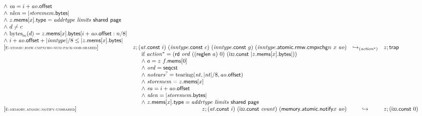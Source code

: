$$\begin{array}[t]{@{}lrcl@{}l@{}}
{\begin{array}[t]{@{}l@{}}
{\land}~ {\mathit{ea}} = i + {\mathit{ao}}{.}\mathsf{offset} \\
{\land}~ {\mathit{nlen}} = {|{\mathit{storemem}}{.}\mathsf{bytes}|} \\
{\land}~ z{.}\mathsf{mems}{}[x]{.}\mathsf{type} = {\mathit{addrtype}}~{\mathit{limits}}~\mathsf{shared}~\mathsf{page} \\
{\land}~ d \neq c \\
{\land}~ {{\mathrm{bytes}}}_{{\mathsf{i}}{n}}(d) = z{.}\mathsf{mems}{}[x]{.}\mathsf{bytes}{}[i + {\mathit{ao}}{.}\mathsf{offset} : n / 8] \\
{\land}~ i + {\mathit{ao}}{.}\mathsf{offset} + {|{\mathit{inntype}}|} / 8 \leq {|z{.}\mathsf{mems}{}[x]{.}\mathsf{bytes}|} \\
\end{array}
} \\
{[\textsc{\scriptsize E{-}atomic.rmw.cmpxchg{-}num{-}pack{-}oob{-}shared}]} \quad & z ; ({\mathit{at}}{.}\mathsf{const}~i)~({\mathit{inntype}}{.}\mathsf{const}~c)~({\mathit{inntype}}{.}\mathsf{const}~g)~({{\mathit{inntype}}{.}\mathsf{atomic}{.}\mathsf{rmw}{.}\mathsf{cmpxchg}}{n}~x~{\mathit{ao}}) & {\hookrightarrow}_{({{\mathit{action}}^\ast})} {} & z ; \mathsf{trap} &  \\
& \multicolumn{4}{@{}l@{}}{\quad
\quad
\begin{array}[t]{@{}l@{}}
\mbox{if}~ {{\mathit{action}}^\ast} = (\mathsf{rd}~{\mathit{ord}}~((\mathsf{reglen}~a)~0)~(\mathsf{i{\scriptstyle 32}}{.}\mathsf{const}~{|z{.}\mathsf{mems}{}[x]{.}\mathsf{bytes}|})) \\
{\land}~ a = z~f{.}\mathsf{mems}{}[0] \\
{\land}~ {\mathit{ord}} = \mathsf{seqcst} \\
{\land}~ {{\mathit{notears}}^?} = {\mathrm{tearing}}({\mathit{nt}}, {|{\mathit{nt}}|} / 8, {\mathit{ao}}{.}\mathsf{offset}) \\
{\land}~ {\mathit{storemem}} = z{.}\mathsf{mems}{}[x] \\
{\land}~ {\mathit{ea}} = i + {\mathit{ao}}{.}\mathsf{offset} \\
{\land}~ {\mathit{nlen}} = {|{\mathit{storemem}}{.}\mathsf{bytes}|} \\
{\land}~ z{.}\mathsf{mems}{}[x]{.}\mathsf{type} = {\mathit{addrtype}}~{\mathit{limits}}~\mathsf{shared}~\mathsf{page} \\
\end{array}
} \\
{[\textsc{\scriptsize E{-}memory.atomic.notify{-}unshared}]} \quad & z ; ({\mathit{at}}{.}\mathsf{const}~i)~(\mathsf{i{\scriptstyle 32}}{.}\mathsf{const}~{\mathit{count}})~({\mathsf{memory{.}atomic{.}notify}}{x}~{\mathit{ao}}) & \hookrightarrow & z ; (\mathsf{i{\scriptstyle 32}}{.}\mathsf{const}~0) & \quad

\end{array}$$
